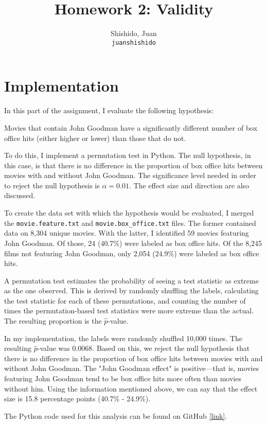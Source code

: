 \documentclass[11pt]{article}
\title{Homework 2: Validity}
\author{
  Shishido, Juan\\
  \texttt{juanshishido}
}
\begin{document}
\maketitle

\section{Implementation}

In this part of the assignment, I evaluate the following hypothesis:

\begin{displayquote}
Movies that contain John Goodman have a significantly different number of box
office hits (either higher or lower) than those that do not.
\end{displayquote}

To do this, I implement a permutation test in Python. The null hypothesis, in
this case, is that there is no difference in the proportion of box office hits
between movies with and without John Goodman. The significance level needed in
order to reject the null hypothesis is $\alpha = 0.01$. The effect size and
direction are also discussed.

To create the data set with which the hypothesis would be evaluated, I merged
the \lstinline{movie.feature.txt} and \lstinline{movie.box_office.txt} files.
The former contained data on 8,304 unique movies. With the latter, I identified
59 movies featuring John Goodman. Of those, 24 (40.7\%) were labeled as box
office hits. Of the 8,245 films not featuring John Goodman, only 2,054 (24.9\%)
were labeled as box office hits.

A permutation test estimates the probability of seeing a test statistic as
extreme as the one observed. This is derived by randomly shuffling the labels,
calculating the test statistic for each of these permutations, and counting the
number of times the permutation-based test statistics were more extreme than
the actual. The resulting proportion is the $\hat{p}$-value.

In my implementation, the labels were randomly shuffled 10,000 times. The
resulting $\hat{p}$-value was 0.0068. Based on this, we reject the null
hypothesis that there is no difference in the proportion of box office hits
between movies with and without John Goodman. The "John Goodman effect" is
positive---that is, movies featuring John Goodman tend to be box office hits
more often than movies without him. Using the information mentioned above, we
can say that the effect size is 15.8 percentage points (40.7\% - 24.9\%).

The Python code used for this analysis can be found on GitHub
\href{https://github.com/juanshishido/info290-dds/blob/master/assignments/assignment02/code/permutation.py}{[link]}.
\end{document}
